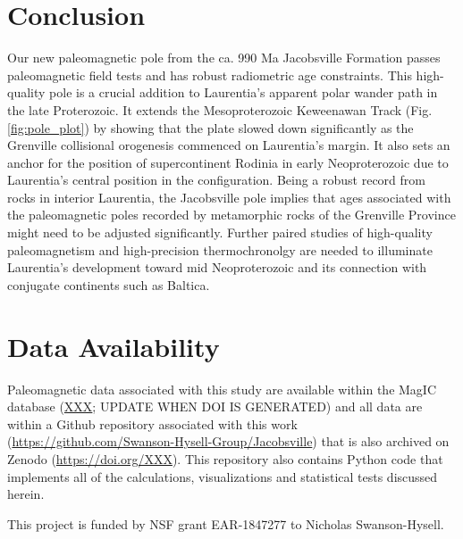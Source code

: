\documentclass[draft]{agujournal2019}
\begin{document}
\section*{Conclusion}

Our new paleomagnetic pole from the ca. 990 Ma Jacobsville Formation passes paleomagnetic field tests and has robust radiometric age constraints. This high-quality pole is a crucial addition to Laurentia's apparent polar wander path in the late Proterozoic. It extends the Mesoproterozoic Keweenawan Track (Fig. \ref{fig:pole_plot}) by showing that the plate slowed down significantly as the Grenville collisional orogenesis commenced on Laurentia's margin. It also sets an anchor for the position of supercontinent Rodinia in early Neoproterozoic due to Laurentia's central position in the configuration. Being a robust record from rocks in interior Laurentia, the Jacobsville pole implies that ages associated with the paleomagnetic poles recorded by metamorphic rocks of the Grenville Province might need to be adjusted significantly. Further paired studies of high-quality paleomagnetism and high-precision thermochronolgy are needed to illuminate Laurentia's development toward mid Neoproterozoic and its connection with conjugate continents such as Baltica. 


\section*{Data Availability}
Paleomagnetic data associated with this study are available within the MagIC database (\url{XXX}; UPDATE WHEN DOI IS GENERATED) and all data are within a Github repository associated with this work (\url{https://github.com/Swanson-Hysell-Group/Jacobsville}) that is also archived on Zenodo (\url{https://doi.org/XXX}). This repository also contains Python code that implements all of the calculations, visualizations and statistical tests discussed herein. 

\acknowledgments
This project is funded by NSF grant EAR-1847277 to Nicholas Swanson-Hysell. 


\end{document}

